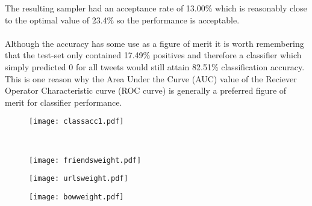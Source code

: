 \documentclass[paper=a4, fontsize=11pt]{scrartcl} %
\numberwithin{equation}{section} %
\numberwithin{figure}{section} %
\numberwithin{table}{section} %
\begin{document}
The resulting sampler had an acceptance rate of 13.00\% which is reasonably close to the optimal value of 23.4\% so the performance is acceptable.\\

\\

Although the accuracy has some use as a figure of merit it is worth remembering that the test-set only contained 17.49\% positives and therefore a classifier which simply predicted 0 for all tweets would still attain 82.51\% classification accuracy. This is one reason why the Area Under the Curve (AUC) value of the Reciever Operator Characteristic curve (ROC curve) is generally a preferred figure of merit for classifier performance.\\

\begin{figure}[!h]
\centering
\texttt{[image: classacc1.pdf]}%
\end{figure}


\\


\begin{figure}[!h]
\centering
\texttt{[image: friendsweight.pdf]}%
\end{figure}
\begin{figure}[!h]
\centering
\texttt{[image: urlsweight.pdf]}%
\end{figure}
\begin{figure}[!h]
\centering
\texttt{[image: bowweight.pdf]}%
\end{figure}

\
\\


\\
\end{document}
